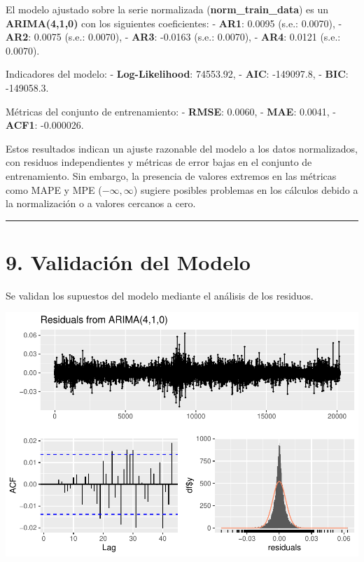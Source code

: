 \documentclass[
]{book}
\begin{document}
El modelo ajustado sobre la serie normalizada (\textbf{norm\_train\_data}) es un \textbf{ARIMA(4,1,0)} con los siguientes coeficientes: - \textbf{AR1}: 0.0095 (s.e.: 0.0070), - \textbf{AR2}: 0.0075 (s.e.: 0.0070), - \textbf{AR3}: -0.0163 (s.e.: 0.0070), - \textbf{AR4}: 0.0121 (s.e.: 0.0070).

Indicadores del modelo: - \textbf{Log-Likelihood}: 74553.92, - \textbf{AIC}: -149097.8, - \textbf{BIC}: -149058.3.

Métricas del conjunto de entrenamiento: - \textbf{RMSE}: 0.0060, - \textbf{MAE}: 0.0041, - \textbf{ACF1}: -0.000026.

Estos resultados indican un ajuste razonable del modelo a los datos normalizados, con residuos independientes y métricas de error bajas en el conjunto de entrenamiento. Sin embargo, la presencia de valores extremos en las métricas como MAPE y MPE (\(-\infty, \infty\)) sugiere posibles problemas en los cálculos debido a la normalización o a valores cercanos a cero.

\begin{center}\rule{0.5\linewidth}{0.5pt}\end{center}

\section{9. Validación del Modelo}\label{validaciuxf3n-del-modelo}

Se validan los supuestos del modelo mediante el análisis de los residuos.

\includegraphics{bookdown_time_series_files/figure-latex/validate-model-1-1.pdf}
\end{document}
